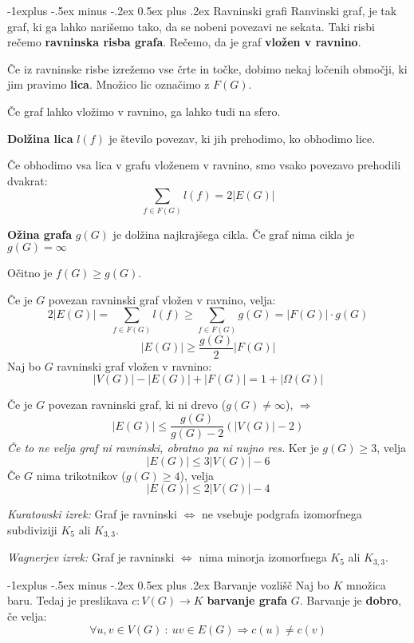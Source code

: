 \documentclass[a4paper,8pt]{extarticle}
\makeatletter
\renewcommand{\subsection}{\@startsection{subsection}{2}{0mm}%
                                {-1explus -.5ex minus -.2ex}%
                                {0.5ex plus .2ex}%
                                {\normalfont\normalsize\bfseries}}
\makeatother
\begin{document}
\begin{multicols}{4}
\subsection{Ravninski grafi}
Ranvinski graf, je tak graf, ki ga lahko narišemo tako, da se nobeni povezavi ne sekata. Taki risbi
rečemo \textbf{ravninska risba grafa}. Rečemo, da je graf \textbf{vložen v ravnino}.

Če iz ravninske risbe izrežemo vse črte in točke, dobimo nekaj ločenih območji, ki jim pravimo \textbf{lica}.
Množico lic označimo z $F(G)$.

Če graf lahko vložimo v ravnino, ga lahko tudi na sfero.

\textbf{Dolžina lica} $l(f)$ je število povezav, ki jih prehodimo, ko obhodimo lice.

Če obhodimo vsa lica v grafu vloženem v ravnino, smo vsako povezavo prehodili dvakrat:
\[\sum_{f \in F(G)} l(f) = 2|E(G)| \]


\textbf{Ožina grafa} $g(G)$ je dolžina najkrajšega cikla. Če graf nima cikla je $g(G) = \infty$

Očitno je $f(G) \geq g(G)$. 

Če je $G$ povezan ravninski graf vložen v ravnino, velja:
\[2|E(G)| = \sum_{f \in F(G)} l(f) \geq \sum_{f \in F(G)} g(G) = |F(G)|\cdot g(G) \]
\[ |E(G)| \geq \frac{g(G)}{2} |F(G)| \]
Naj bo $G$ ravninski graf vložen v ravnino:
\[|V(G)| - |E(G)| + |F(G)| = 1+|\Omega(G)| \]

Če je $G$ povezan ravninski graf, ki ni drevo ($ g(G) \neq \infty $), $\Rightarrow$
\[ |E(G)| \leq \frac{g(G)}{g(G)-2}(|V(G)| -2) \]
\emph{Če to ne velja graf ni ravninski, obratno pa ni nujno res.}
Ker je $g(G) \geq 3$, velja
\[ |E(G)| \leq 3|V(G)| - 6\]
Če $G$ nima trikotnikov ($g(G) \geq 4$), velja
\[ |E(G)| \leq 2|V(G)| - 4\]

\emph{Kuratowski izrek:} Graf je ravninski $\Leftrightarrow$ ne vsebuje podgrafa izomorfnega subdiviziji
$K_5$ ali $K_{3,3}$.

\emph{Wagnerjev izrek:} Graf je ravninski $\Leftrightarrow$ nima minorja izomorfnega $K_5$ ali $K_{3,3}$.

\subsection{Barvanje vozlišč}
Naj bo $K$ množica baru. Tedaj je preslikava $c:V(G) \to K$ \textbf{barvanje grafa} $G$.
Barvanje je \textbf{dobro}, če velja:
\[\forall u,v \in V(G)\ :\ uv \in E(G) \Rightarrow c(u) \neq c(v)  \]


\end{multicols}
\end{document}
